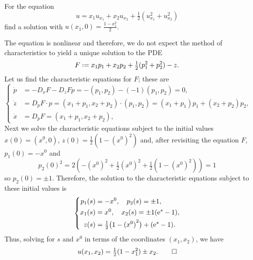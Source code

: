 \begin{problem}
  For the equation
  \[
    u=x_1u_{x_1}+x_2u_{x_2}+\tfrac{1}{2}(u_{x_1}^2+u_{x_2}^2)
  \]
  find a solution with \(u(x_1,0)=\frac{1-x_1^2}{2}\).
\end{problem}
\begin{solution*}
  The equation is nonlinear and therefore, we do not expect the method of
  characteristics to yield a unique solution to the PDE
  \[
    F\defeq x_1p_1+x_2p_2+\tfrac{1}{2}(p_1^2+p_2^2)-z.
  \]
  Let us find the characteristic equations for \(F\); these are
  \[
    \left\{
      \begin{aligned}
        \dot p&=-D_xF-D_zFp=-(p_1,p_2)-(-1)(p_1,p_2)=0,\\
        \dot z&=D_pF\cdot p=(x_1+p_1,x_2+p_2)\cdot
                (p_1,p_2)=(x_1+p_1)p_1+(x_2+p_2)p_2,\\
        \dot x&=D_pF=(x_1+p_1,x_2+p_2),
      \end{aligned}
    \right.
  \]
  Next we solve the characteristic equations subject to the initial values
  \(x(0)=(x^0,0)\), \(z(0)=\frac{1}{2}(1-{(x^0)}^2)\) and, after
  revisiting the equation \(F\), \(p_1(0)=-x^0\) and
  \[
    p_2(0)^2=
    2\left(-{(x^0)}^2+\tfrac{1}{2}{(x^0)}^2+\tfrac{1}{2}(1-{(x^0)}^2)\right)=1
  \]
  so \(p_2(0)=\pm 1\). Therefore, the solution to the characteristic
  equations subject to these initial values is
  \[
    \left\{
      \begin{aligned}
        p_1(s)&=-x^0,\quad p_2(s)=\pm 1,\\
        x_1(s)&=x^0,\quad x_2(s)=\pm 1(\mathrm{e}^s-1),\\
        z(s)&=\tfrac{1}{2}\bigl(1-{(x^0)}^2\bigr)+(\mathrm{e}^s-1).
      \end{aligned}
    \right.
  \]
  Thus, solving for \(s\) and \(x^0\) in terms of the coordinates
  \((x_1,x_2)\), we have
  \[
    u(x_1,x_2)=\tfrac{1}{2}(1-x_1^2)\pm x_2.\qedhere
  \]
\end{solution*}

